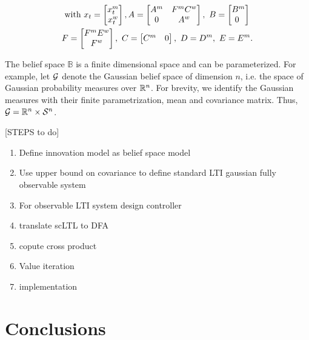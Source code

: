 \documentclass{ifacconf}
\newcommand{\red}[1]{{\color{red} #1}}
\begin{document}
\begin{align}& \mbox{ with }  x_t	= \begin{bmatrix}
	x^m_{t}	\\x^w_{t}
	\end{bmatrix},
A = \begin{bmatrix}
 	A^m 	& F^mC^w\\
 	0 & A^w
 \end{bmatrix}, \ 
B = \begin{bmatrix} B^m \\ 0~ \end{bmatrix}\notag \\
&F=\begin{bmatrix}
	F^m E^w \\
	F^w
	\end{bmatrix},\ 
C = \begin{bmatrix} C^m& 0 \end{bmatrix} , \ 
D= D^m, \  E = E^m.\notag
\end{align}
 
 \noindent{\textbf{}}
The belief space $\mathbb{B}$ is  a finite dimensional space and can be parameterized. For example, let $\mathcal{G}$ denote the Gaussian belief space
    of dimension $n$, i.e. the space of Gaussian
    probability measures over $\mathbb{R}^n$.
    For brevity, we identify the Gaussian measures
    with their finite parametrization, mean and
    covariance matrix.
     Thus,
    $\mathcal{G} =  \mathbb{R}^n \times  \mathcal S^n$.
    
    \red{[STEPS to do]
  \begin{enumerate}
  	\item Define innovation model as belief space model
  	\item Use upper bound on covariance to define standard LTI gaussian fully observable system
  	\item For observable LTI system design controller
  	\item translate scLTL to DFA
  	\item copute cross product
  	\item Value iteration
  	\item implementation
  \end{enumerate}
  
  
  }
    
  
\section{Conclusions}




\end{document}
